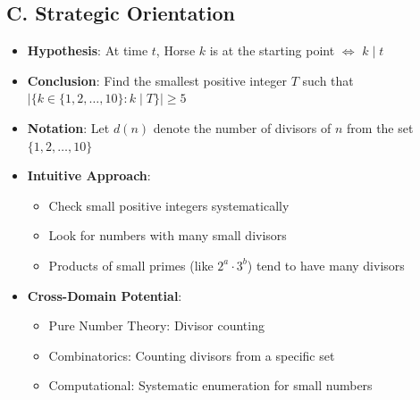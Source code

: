 \documentclass[]{article}
\begin{document}
\begin{problemconfigbox}
\subsection*{C. Strategic Orientation}
\begin{itemize}[leftmargin=*]
    \item \textbf{Hypothesis}: At time $t$, Horse $k$ is at the starting point $\Leftrightarrow$ $k \mid t$
    \item \textbf{Conclusion}: Find the smallest positive integer $T$ such that $|\{k \in \{1,2,\ldots,10\} : k \mid T\}| \geq 5$
    \item \textbf{Notation}: Let $d(n)$ denote the number of divisors of $n$ from the set $\{1,2,\ldots,10\}$
    \item \textbf{Intuitive Approach}: 
    \begin{itemize}
        \item Check small positive integers systematically
        \item Look for numbers with many small divisors
        \item Products of small primes (like $2^a \cdot 3^b$) tend to have many divisors
    \end{itemize}
    \item \textbf{Cross-Domain Potential}: 
    \begin{itemize}
        \item Pure Number Theory: Divisor counting
        \item Combinatorics: Counting divisors from a specific set
        \item Computational: Systematic enumeration for small numbers
    \end{itemize}
\end{itemize}
\end{problemconfigbox}
\end{document}
